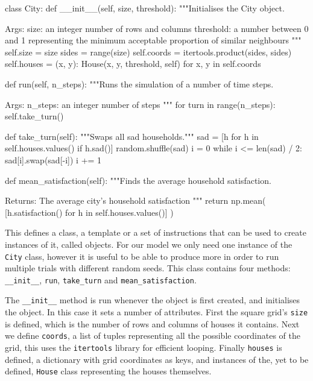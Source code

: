 \begin{pyin}
class City:
    def __init__(self, size, threshold):
        """Initialises the City object.

        Args:
            size: an integer number of rows and columns
            threshold: a number between 0 and 1 representing
              the minimum acceptable proportion of similar
              neighbours
        """
        self.size = size
        sides = range(size)
        self.coords = itertools.product(sides, sides)
        self.houses = {
            (x, y): House(x, y, threshold, self)
            for x, y in self.coords
        }

    def run(self, n_steps):
        """Runs the simulation of a number of time steps.

        Args:
            n_steps: an integer number of steps
        """
        for turn in range(n_steps):
            self.take_turn()

    def take_turn(self):
        """Swaps all sad households."""
        sad = [h for h in self.houses.values() if h.sad()]
        random.shuffle(sad)
        i = 0
        while i <= len(sad) / 2:
            sad[i].swap(sad[-i])
            i += 1

    def mean_satisfaction(self):
        """Finds the average household satisfaction.

        Returns:
            The average city's household satisfaction
        """
        return np.mean(
            [h.satisfaction() for h in self.houses.values()]
        )
\end{pyin}

This defines a class, a template or a set of instructions that can be used to
create instances of it, called objects.
For our model we only need one instance of the \texttt{City} class,
however it is useful to be able to produce more in order to run multiple trials
with different random seeds.
This class contains four methods: \texttt{__init__},
\texttt{run}, \texttt{take_turn} and
\texttt{mean_satisfaction}.

The \texttt{__init__} method is run whenever the object is first
created, and initialises the object.
In this case it sets a number of attributes.
First the square grid's \texttt{size} is defined, which is the
number of rows and columns of houses it contains.
Next we define \texttt{coords}, a list of tuples representing all
the possible coordinates of the grid, this uses the
\texttt{itertools} library for efficient looping.
Finally \texttt{houses} is defined, a dictionary with grid
coordinates as keys, and instances of the, yet to be defined,
\texttt{House} class representing the houses themselves.

